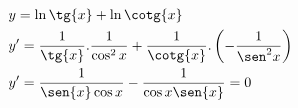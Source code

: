 \begin{ex}
\begin{align}
&y=\ln{\tg{x}}+\ln{\cotg{x}}\nonumber\\
&y'=\frac{1}{\tg{x}}.\frac{1}{\cos^2{x}}+\frac{1}{\cotg{x}}.\left(-\frac{1}{\sen^2{x}}\right)\nonumber\\
&y'=\frac{1}{\sen{x}\cos{x}}-\frac{1}{\cos{x}{\sen{x}}}=0\nonumber
\end{align}
\end{ex}
